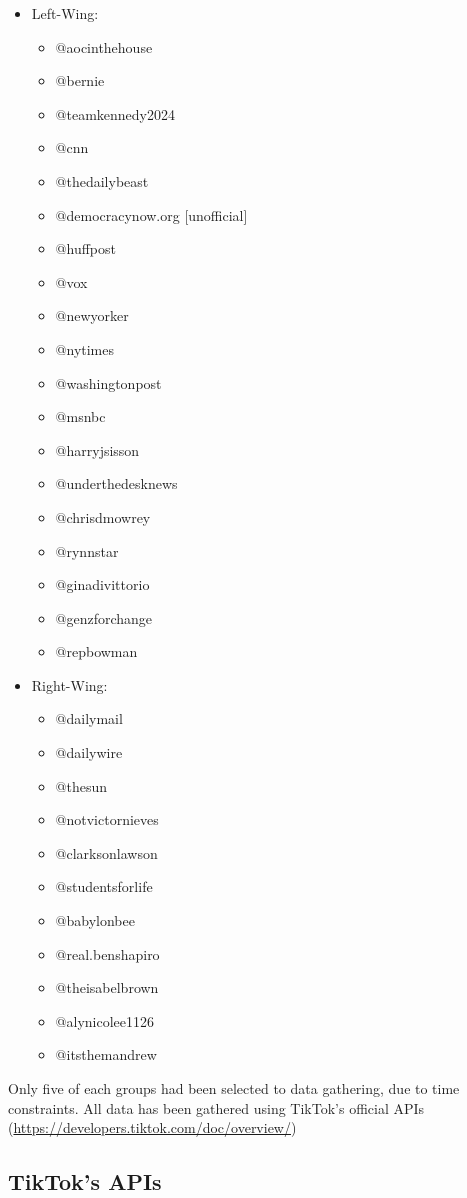 \begin{itemize}
    \item Left-Wing: 
        \begin{itemize}
            \item @aocinthehouse \cite{wikiDem,yougovDem}
            \item @bernie \cite{wikiDem,yougovDem}
            \item @teamkennedy2024 \cite{wikiDem,yougovDem}
            \item @cnn
            \item @thedailybeast
            \item @democracynow.org [unofficial]
            \item @huffpost
            \item @vox
            \item @newyorker
            \item @nytimes
            \item @washingtonpost 
            \item @msnbc
            \item @harryjsisson
            \item @underthedesknews
            \item @chrisdmowrey
            \item @rynnstar 
            \item @ginadivittorio
            \item @genzforchange
            \item @repbowman
        \end{itemize}
    \item Right-Wing:
        \begin{itemize}
            \item @dailymail
            \item @dailywire
            \item @thesun
            \item @notvictornieves
            \item @clarksonlawson
            \item @studentsforlife
            \item @babylonbee
            \item @real.benshapiro
            \item @theisabelbrown 
            \item @alynicolee1126 
            \item @itsthemandrew 
        \end{itemize}
\end{itemize}
Only five of each groups had been selected to data gathering, due to time constraints. All data has been gathered using TikTok's official APIs (\href{https://developers.tiktok.com/doc/overview/}{https://developers.tiktok.com/doc/overview/})

\subsection{TikTok's APIs}